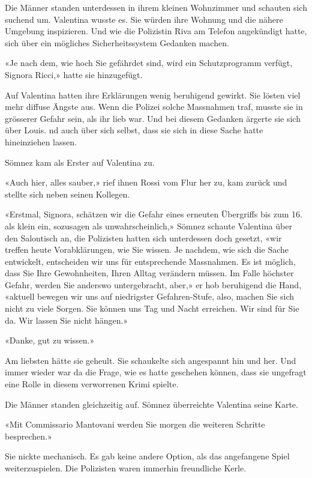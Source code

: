 Die Männer standen unterdessen in ihrem kleinen Wohnzimmer und schauten
sich suchend um. Valentina wusste es. Sie würden ihre Wohnung und die
nähere Umgebung inspizieren. Und wie die Polizistin Riva am Telefon
angekündigt hatte, sich über ein mögliches Sicherheitssystem Gedanken
machen.

«Je nach dem, wie hoch Sie gefährdet sind, wird ein Schutzprogramm
verfügt, Signora Ricci,» hatte sie hinzugefügt.

Auf Valentina hatten ihre Erklärungen wenig beruhigend gewirkt. Sie
lösten viel mehr diffuse Ängste aus. Wenn die Polizei solche Massnahmen
traf, musste sie in grösserer Gefahr sein, als ihr lieb war. Und bei
diesem Gedanken ärgerte sie sich über Louis. nd auch über sich selbst,
dass sie sich in diese Sache hatte hineinziehen lassen.

Sömnez kam als Erster auf Valentina zu.

«Auch hier, alles sauber,» rief ihnen Rossi vom Flur her zu, kam zurück
und stellte sich neben seinen Kollegen.

«Erstmal, Signora, schätzen wir die Gefahr eines erneuten Übergriffs bis
zum 16. als klein ein, sozusagen als unwahrscheinlich,» Sömnez schaute
Valentina über den Salontisch an, die Polizisten hatten sich unterdessen
doch gesetzt, «wir treffen heute Vorabklärungen, wie Sie wissen. Je
nachdem, wie sich die Sache entwickelt, entscheiden wir uns für
entsprechende Massnahmen. Es ist möglich, dass Sie Ihre Gewohnheiten,
Ihren Alltag verändern müssen. Im Falle höchster Gefahr, werden Sie
anderswo untergebracht, aber,» er hob beruhigend die Hand, «aktuell
bewegen wir uns auf niedrigster Gefahren-Stufe, also, machen Sie sich
nicht zu viele Sorgen. Sie können uns Tag und Nacht erreichen. Wir sind
für Sie da. Wir lassen Sie nicht hängen.»

«Danke, gut zu wissen.»

Am liebsten hätte sie geheult. Sie schaukelte sich angespannt hin und
her. Und immer wieder war da die Frage, wie es hatte geschehen können,
dass sie ungefragt eine Rolle in diesem verworrenen Krimi spielte.

Die Männer standen gleichzeitig auf. Sömnez überreichte Valentina seine
Karte.

«Mit Commissario Mantovani werden Sie morgen die weiteren Schritte
besprechen.»

Sie nickte mechanisch. Es gab keine andere Option, als das angefangene
Spiel weiterzuspielen. Die Polizisten waren immerhin freundliche Kerle.

